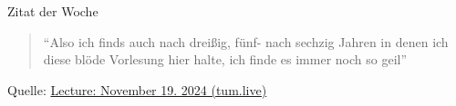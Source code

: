 \documentclass[
  german,            %
  aspectratio=169,    %
]{tumbeamer}
\begin{document}
\begin{frame}[c, fragile]{}{}
  \begin{center}
    \vspace{0.5cm}
    \begin{block}{Zitat der Woche}
      \vspace{0.5cm}
      \begin{quote}
        ``Also ich finds auch nach dreißig, fünf- nach sechzig Jahren in denen ich diese blöde Vorlesung hier halte, ich finde es immer noch so geil''
        \vspace{0.5cm}
      \end{quote}
      \vspace{0.5cm}
    \end{block}
    \vspace{0.5cm}
    Quelle: \href{https://tum.live/w/ws24EidR/50022?t=5530}{Lecture: November 19. 2024 (tum.live)}
\end{center}
\end{frame}
\end{document}

